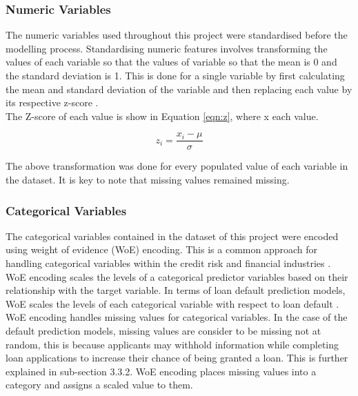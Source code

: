 \subsubsection{Numeric Variables}

The numeric variables used throughout this project were standardised before the modelling process. Standardising numeric features involves transforming the values of each variable so that the values of variable so that the mean is 0 and the standard deviation is 1. This is done for a single variable by first calculating the mean and standard deviation of the variable and then replacing each value by its respective z-score \parencite{ZScore}. \\

The Z-score of each value is show in Equation \ref{eqn:z}, where x each value. 

\vspace{10pt}

\begin{equation}\label{eqn:z}
    z_{i} = \dfrac{x_{i}-\mu}{\sigma}
\end{equation}

\vspace{10pt}

The above transformation was done for every populated value of each variable in the dataset. It is key to note that missing values remained missing.  

\subsubsection{Categorical Variables}

The categorical variables contained in the dataset of this project were encoded using weight of evidence (WoE) encoding. This is a common approach for handling categorical variables within the credit risk and financial industries \parencite{WOE}. WoE encoding scales the levels of a categorical predictor variables based on their relationship with the target variable. In terms of loan default prediction models, WoE scales the levels of each categorical variable with respect to loan default \parencite{WOE}. \\

WoE encoding handles missing values for categorical variables. In the case of the default prediction models, missing values are consider to be missing not at random, this is because applicants may withhold information while completing loan applications to increase their chance of being granted a loan. This is further explained in sub-section 3.3.2. WoE encoding places missing values into a category and assigns a scaled value to them. \\

